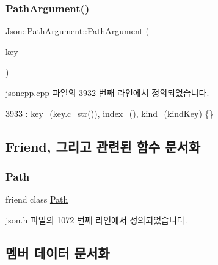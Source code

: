 \subsubsection{\texorpdfstring{Path\+Argument()}{PathArgument()}\hspace{0.1cm}{\footnotesize\ttfamily [4/4]}}
{\footnotesize\ttfamily Json\+::\+Path\+Argument\+::\+Path\+Argument (\begin{DoxyParamCaption}\item[{const \hyperlink{json_8h_a1e723f95759de062585bc4a8fd3fa4be}{J\+S\+O\+N\+C\+P\+P\+\_\+\+S\+T\+R\+I\+NG} \&}]{key }\end{DoxyParamCaption})}



jsoncpp.\+cpp 파일의 3932 번째 라인에서 정의되었습니다.


\begin{DoxyCode}
3933     : \hyperlink{class_json_1_1_path_argument_af4024368548ff730ef2bed97d6f1ca43}{key\_}(key.c\_str()), \hyperlink{class_json_1_1_path_argument_afd5857d1b6bfaae6961333bdae7bd5ec}{index\_}(), \hyperlink{class_json_1_1_path_argument_ad4bc4b544b155a3d9c7788572ecf991b}{kind\_}(\hyperlink{class_json_1_1_path_argument_a2420bbad778573c147e578701b84d9b9a74f5968d06c01701b7a46092c33ba7d1}{kindKey}) \{\}
\end{DoxyCode}


\subsection{Friend, 그리고 관련된 함수 문서화}
\mbox{\label{class_json_1_1_path_argument_a4877239a6b7f09fbf5a61ca68a49d74c}} 
\subsubsection{\texorpdfstring{Path}{Path}}
{\footnotesize\ttfamily friend class \hyperlink{class_json_1_1_path}{Path}\hspace{0.3cm}{\ttfamily [friend]}}



json.\+h 파일의 1072 번째 라인에서 정의되었습니다.



\subsection{멤버 데이터 문서화}
\mbox{\label{class_json_1_1_path_argument_afd5857d1b6bfaae6961333bdae7bd5ec}} 
